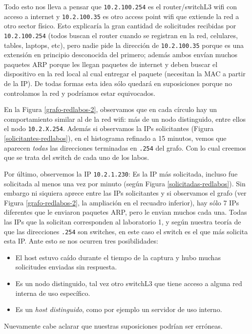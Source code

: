 Todo esto nos lleva a pensar que {\tt 10.2.100.254} es el router/switchL3 wifi con acceso a internet
y {\tt 10.2.100.35} es otro access point wifi que extiende la red a otro sector físico. Esto explicaría la gran cantidad de solicitudes recibidas
por {\tt 10.2.100.254} (todos buscan el router cuando se registran en la red, celulares, tables, laptops, etc),
pero nadie pide la dirección de {\tt 10.2.100.35} porque es una extensión en principio desconocida
del primero; además ambos envían muchos paquetes ARP porque les llegan paquetes de internet y deben buscar el dispositivo en la red local al cual entregar
el paquete (necesitan la MAC a partir de la IP). De todas formas esta idea sólo quedará en suposiciones porque no controlamos la red y podríamos estar equivocados.

En la Figura \ref{grafo-redlabos-2}, observamos que en cada círculo hay un comportamiento similar al de la red wifi: más de un nodo distinguido, entre ellos
el nodo {\tt 10.2.X.254}. Además si observamos la IPs solicitantes (Figura \ref{solicitantes-redlabos}), en el histograma refinado a 15 minutos, vemos que
aparecen \emph{todas} las direcciones terminadas en {\tt .254} del grafo. Con lo cual creemos que se trata del switch de cada uno de los labos.

Por último, observemos la IP {\tt 10.2.1.230}: Es la IP más solicitada, incluso fue solicitada al menos una vez por minuto 
(según Figura \ref{solicitadas-redlabos}). Sin embargo ni siquiera aprece entre las IPs solicitantes y si observamos el grafo (ver Figura \ref{grafo-redlabos-2}, la ampliación en el recuadro inferior), hay sólo 7 IPs diferentes que le enviaron paquetes ARP, pero le envian muchos cada una. Todas las
IPs que la solicitan corresponden al laboratorio 1, y según nuestra teoría de que las direcciones {\tt .254} son switches, en este caso el switch es el
que más solicita esta IP. Ante esto se nos ocurren tres posibilidades:
\begin{itemize}
 \item El host estuvo caído durante el tiempo de la captura y hubo muchas solicitudes enviadas sin respuesta.
 \item Es un nodo distinguido, tal vez otro switchL3 que tiene acceso a alguna red interna de uso específico.
 \item Es un \emph{host distinguido}, como por ejemplo un servidor de uso interno.
\end{itemize}

Nuevamente cabe aclarar que nuestras suposiciones podrían ser erróneas.

